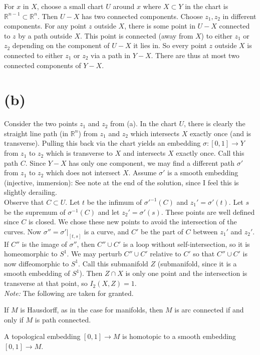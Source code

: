 \documentclass{amsbook}
\theoremstyle{theorem}
\theoremstyle{plain}
\theoremstyle{remark}
\newcommand{\R}{\mathbb R}
\begin{document}
For $x$ in $X$, choose a small chart $U$ around $x$ where $X\subset Y$ in the chart is $\R^{n-1}\subset \R^n$. Then $U-X$ has two connected components. Choose $z_1, z_2$ in different components. For any point $z$ outside $X$, there is some point in $U-X$ connected to $z$ by a path outside $X$. This point is connected (away from $X$) to either $z_1$ or $z_2$ depending on the component of $U-X$ it lies in. So every point $z$ outside $X$ is connected to either $z_1$ or $z_2$ via a path in $Y - X$. There are thus at most two connected components of $Y-X$.

\section*{(b)}

Consider the two points $z_1$ and $z_2$ from (a). In the chart $U$, there is clearly the straight line path (in $\R^n$) from $z_1$ and $z_2$ which intersects $X$ exactly once (and is transverse). Pulling this back via the chart yields an embedding $\sigma:[0,1] \to Y$ from $z_1$ to $z_2$ which is transverse to $X$ and intersects $X$ exactly once. Call this path $C$. Since $Y-X$ has only one component, we may find a different path $\sigma'$ from $z_1$ to $z_2$ which does not intersect $X$. Assume $\sigma'$ is a smooth embedding (injective, immersion): See note at the end of the solution, since I feel this is slightly derailing. \\

Observe that $C\subset U$. Let $t$ be the infimum of $\sigma'^{-1}(C)$ and $z_1' = \sigma'(t)$. Let $s$ be the supremum of $\sigma^{-1}(C)$ and let $z_2' = \sigma'(s)$. These points are well defined since $C$ is closed. We chose these new points to avoid the intersection of the curves. Now $\sigma'' = \sigma'|_{[t,s]}$ is a curve, and $C'$ be the part of $C$ between $z_1'$ and $z_2'$. If $C''$ is the image of $\sigma''$, then $C'' \cup C'$ is a loop without self-intersection, so it is homeomorphic to $S^1$. We may perturb $C''\cup C'$  relative to $C'$ so that $C'' \cup C'$ is now diffeomorphic to $S^1$. Call this submanifold $Z$ (submanifold, since it is a smooth embedding of $S^1$). Then $Z\cap X$ is only one point and the intersection is transverse at that point, so $I_2(X,Z) = 1$.\\

\textit{Note:} The following are taken for granted.
\begin{theorem}
  If $M$ is Hausdorff, as in the case for manifolds, then $M$ is arc connected if and only if $M$ is path connected.
\end{theorem}
\begin{lemma}
  A topological embedding $[0,1]\to M$ is homotopic to a smooth embedding $[0,1]\to M$.
\end{lemma}
\end{document}
